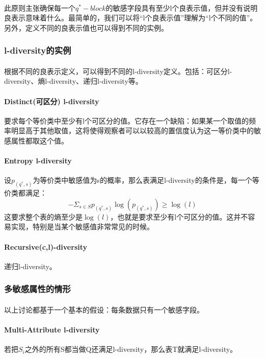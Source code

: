 \documentclass[12pt,a4paper]{article}
\begin{document}
\paragraph{} 此原则主张确保每一个$q^*-block$的敏感字段具有至少l个良表示值，但并没有说明良表示意味着什么。最简单的，我们可以将“l个良表示值”理解为“l个不同的值”。另外，定义不同的良表示值也可以得到不同的实例。
\subsubsection{l-diversity的实例}
\paragraph{} 根据不同的良表示定义，可以得到不同的l-diversity定义。包括：可区分l-diversity、熵l-diversity、递归l-diversity等。

\paragraph{Distinct(可区分) l-diversity} 要求每个等价类中至少有l个可区分的值。它存在一个缺陷：如果某一个取值的频率明显高于其他取值，这将使得观察者可以以较高的置信度认为这一等价类中的敏感属性都取这个值。

\paragraph{Entropy l-diversity} 设$p_(q^*,s)$为等价类中敏感值为s的概率，那么表满足l-diversity的条件是，每一个等价类都满足：
\begin{equation}
	- \Sigma_{s \in S} p_(q^*,s) \log(p_(q^*,s)) \geq \log(l)
\end{equation}
这要求整个表的熵至少是$\log(l)$，也就是要求至少有l个可区分的值。这并不容易实现，特别是当某个敏感值非常常见的时候。

\paragraph{Recursive(c,l)-diversity} 递归l-diversity。 

\subsubsection{多敏感属性的情形}
\paragraph{} 以上讨论都基于一个基本的假设：每条数据只有一个敏感字段。
\paragraph{Multi-Attribute l-diversity} 若把$S_i$之外的所有S都当做Q还满足l-diversity，那么表T就满足l-diversity。
\end{document}
